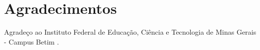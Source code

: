 \chapter*{Agradecimentos}

Agradeço ao Instituto Federal de Educação, Ciência e Tecnologia de Minas Gerais - Campus Betim .
